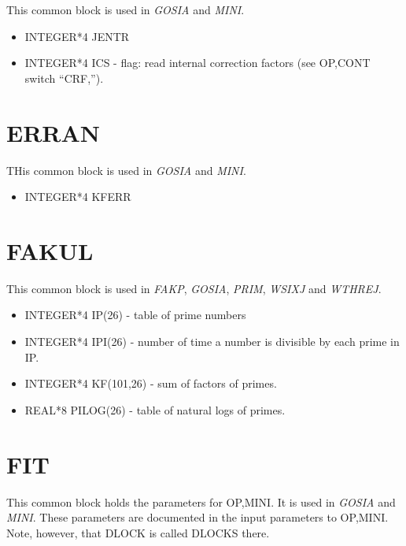 This common block is used in {\em GOSIA} and {\em MINI}.

\begin{itemize}
\item INTEGER*4 JENTR
\item INTEGER*4 ICS - flag: read internal correction factors (see OP,CONT
switch ``CRF,'').
\end{itemize}

\section{ERRAN}

THis common block is used in {\em GOSIA} and {\em MINI}.

\begin{itemize}
\item INTEGER*4 KFERR
\end{itemize}

\section{FAKUL}

This common block is used in {\em FAKP}, {\em GOSIA}, {\em PRIM}, {\em
WSIXJ} and {\em WTHREJ}.

\begin{itemize}
\item INTEGER*4 IP(26) - table of prime numbers
\item INTEGER*4 IPI(26) - number of time a number is divisible by each prime
in IP.
\item INTEGER*4 KF(101,26) - sum of factors of primes.
\item REAL*8 PILOG(26) - table of natural logs of primes.
\end{itemize}

\section{FIT}

This common block holds the parameters for OP,MINI. It is used in {\em
GOSIA} and {\em MINI}. These parameters are documented in the input
parameters to OP,MINI. Note, however, that DLOCK is called DLOCKS there.


